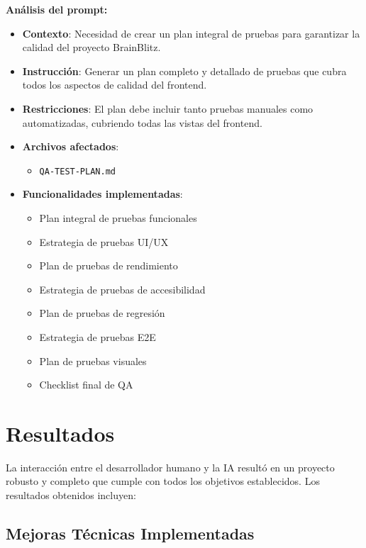 \documentclass[12pt,a4paper]{article}
\begin{document}
\textbf{Análisis del prompt:}
\begin{itemize}
    \item \textbf{Contexto}: Necesidad de crear un plan integral de pruebas para garantizar la calidad del proyecto BrainBlitz.
    
    \item \textbf{Instrucción}: Generar un plan completo y detallado de pruebas que cubra todos los aspectos de calidad del frontend.
    
    \item \textbf{Restricciones}: El plan debe incluir tanto pruebas manuales como automatizadas, cubriendo todas las vistas del frontend.
    
    \item \textbf{Archivos afectados}:
    \begin{itemize}
        \item \texttt{QA-TEST-PLAN.md}
    \end{itemize}
    
    \item \textbf{Funcionalidades implementadas}:
    \begin{itemize}
        \item Plan integral de pruebas funcionales
        \item Estrategia de pruebas UI/UX
        \item Plan de pruebas de rendimiento
        \item Estrategia de pruebas de accesibilidad
        \item Plan de pruebas de regresión
        \item Estrategia de pruebas E2E
        \item Plan de pruebas visuales
        \item Checklist final de QA
    \end{itemize}
\end{itemize}

\section{Resultados}

La interacción entre el desarrollador humano y la IA resultó en un proyecto robusto y completo que cumple con todos los objetivos establecidos. Los resultados obtenidos incluyen:

\subsection{Mejoras Técnicas Implementadas}
\end{document}

